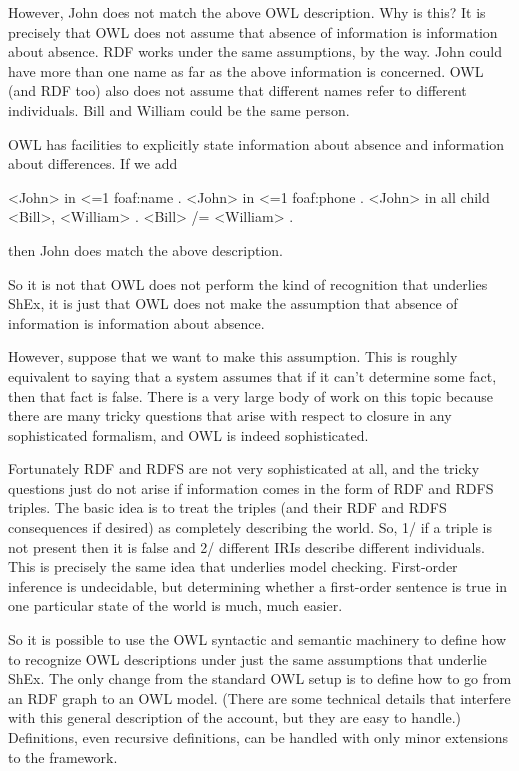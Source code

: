 \documentclass{llncs}
\begin{document}
However, John does not match the above OWL description.  Why is this?  It is
precisely that OWL does not assume that absence of information is
information about absence.  RDF works under the same assumptions, by the
way.  John could have more than one name as far as the above information is
concerned.   OWL (and RDF too) also does not assume that different names
refer to different individuals.  Bill and William could be the same person.

OWL has facilities to explicitly state information about absence and
information about differences.  If we add

\begin{ex}
    <John> in <=1 foaf:name .
    <John> in <=1 foaf:phone .
     <John> in all child {<Bill>, <William>} .
    <Bill> /= <William> .
\end{ex}
		
then John does match the above description.

So it is not that OWL does not perform the kind of recognition that
underlies ShEx, it is just that OWL does not make the assumption that
absence of information is information about absence.

However, suppose that we want to make this assumption.  This is roughly
equivalent to saying that a system assumes that if it can't determine some
fact, then that fact is false.  There is a very large body of work on this
topic because there are many tricky questions that arise with respect to
closure in any sophisticated formalism, and OWL is indeed sophisticated.

Fortunately RDF and RDFS are not very sophisticated at all, and the tricky
questions just do not arise if information comes in the form of RDF and RDFS
triples.  The basic idea is to treat the triples (and their RDF and RDFS
consequences if desired) as completely describing the world.  So, 1/ if a
triple is not present then it is false and 2/ different IRIs describe
different individuals.  This is precisely the same idea that underlies model
checking.  First-order inference is undecidable, but determining whether a
first-order sentence is true in one particular state of the world is much,
much easier.

So it is possible to use the OWL syntactic and semantic machinery to define
how to recognize OWL descriptions under just the same assumptions that
underlie ShEx.  The only change from the standard OWL setup is to define how
to go from an RDF graph to an OWL model.  (There are some technical details
that interfere with this general description of the account, but they are
easy to handle.)  Definitions, even recursive definitions, can be handled
with only minor extensions to the framework.
\end{document}
